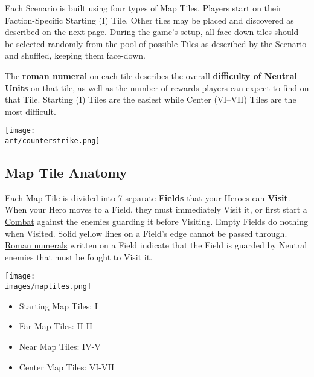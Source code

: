 
\begin{multicols*}{2}
Each Scenario is built using four types of \hypertarget{Map}{Map} Tiles.
Players start on their Faction-Specific Starting (I) Tile.
Other tiles may be placed and discovered as described on the next page.
During the game's setup, all face-down tiles should be selected randomly from the pool of possible Tiles as described by the Scenario and shuffled, keeping them face-down.\par
The \textbf{roman numeral} on each tile describes the overall \textbf{difficulty of Neutral Units} on that tile, as well as the number of rewards players can expect to find on that Tile.
Starting (I) Tiles are the easiest while Center (VI–VII) Tiles are the most difficult.\par

\vfill
\begin{center}
  \texttt{[image: \\art/counterstrike.png]}
\end{center}
\vfill

\subsection*{Map Tile Anatomy}
Each Map Tile is divided into 7 separate \textbf{Fields} that your Heroes can \textbf{Visit}.
When your Hero moves to a Field, they must immediately Visit it, or
first start a \hyperlink{Combat}{Combat} against the enemies guarding it before Visiting.
Empty Fields do nothing when Visited.
Solid yellow lines on a Field's edge cannot be passed through.
\hyperlink{Difficulty}{Roman numerals} written on a Field indicate that the Field is guarded by Neutral enemies that must be fought to Visit it.\par
\columnbreak
\texttt{[image: \\images/maptiles.png]}
\begin{itemize}
  \footnotesize
  \item[\textbf{1.}] Starting Map Tiles: I
  \item[\textbf{2.}] Far Map Tiles: II-II
  \item[\textbf{3.}] Near Map Tiles: IV-V
  \item[\textbf{4.}] Center Map Tiles: VI-VII
\end{itemize}


\end{multicols*}

